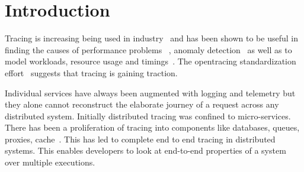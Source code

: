 \section{Introduction}
Tracing is increasing being used in industry~\cite{Jaeger, Zipkin, 36356} and has been shown to be useful in finding the causes of performance problems~ \cite{36356, Fonseca:2007:XPN:1973430.1973450, Reynolds:2006:PDU:1267680.1267689, DBLP:conf/sigmetrics/ThereskaSSWALG06, Sambasivan:2011:DPC:1972457.1972463}, anomaly detection~\cite{Barham:2003:MOM:1251054.1251069, Chen:2004:PFE:1251175.1251198, 37477, Sambasivan:2011:DPC:1972457.1972463} as well as to model workloads, resource usage and timings~\cite{Mann:2011:MPE:2170444.2170464, Chanda:2007:WTP:1272996.1273001, 36356, DBLP:conf/sigmetrics/ThereskaSSWALG06, Barham:2003:MOM:1251054.1251069}.  The opentracing standardization effort~\cite{OpenTracing} suggests that tracing is gaining traction.

Individual services have always been augmented with logging and telemetry but they alone cannot reconstruct the elaborate journey of a request across any distributed system. 
Initially distributed tracing was confined to micro-services. There has been a proliferation of tracing into components like databases, queues, proxies, cache~\cite{OpenTracingCassandra, OpenTracingKafka, OpenTracingRedis}. 
This has led to complete end to end tracing in distributed systems. 
This enables developers to look at end-to-end properties of a system over multiple executions. 

